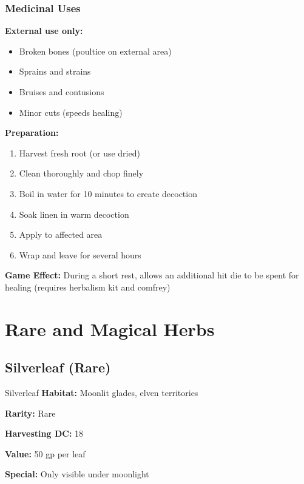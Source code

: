 \documentclass[letterpaper,twocolumn,openany]{dndbook}
\begin{document}
\subsection{Medicinal Uses}

\textbf{External use only:}

\begin{itemize}
    \item Broken bones (poultice on external area)
    \item Sprains and strains
    \item Bruises and contusions
    \item Minor cuts (speeds healing)
\end{itemize}

\textbf{Preparation:}

\begin{enumerate}
    \item Harvest fresh root (or use dried)
    \item Clean thoroughly and chop finely
    \item Boil in water for 10 minutes to create decoction
    \item Soak linen in warm decoction
    \item Apply to affected area
    \item Wrap and leave for several hours
\end{enumerate}

\textbf{Game Effect:} During a short rest, allows an additional hit die to be spent for healing (requires herbalism kit and comfrey)

\chapter{Rare and Magical Herbs}

\section{Silverleaf (Rare)}

\begin{DndSidebar}{Silverleaf}
    \textbf{Habitat:} Moonlit glades, elven territories

    \textbf{Rarity:} Rare

    \textbf{Harvesting DC:} 18

    \textbf{Value:} 50 gp per leaf

    \textbf{Special:} Only visible under moonlight
\end{DndSidebar}
\end{document}
